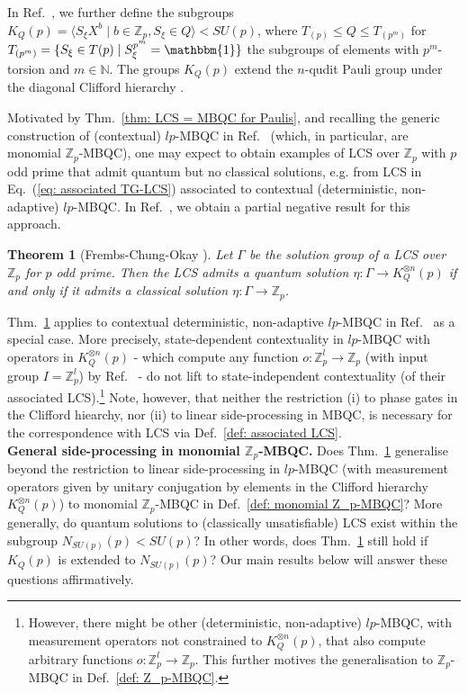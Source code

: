 \documentclass[aps,pra,letterpaper,onrcolumn,nofootinbib,notitlepage,longbibliography]{revtex4-1}
\newtheorem{theorem}{Theorem}
\newcommand{\one}{\mathbbm{1}}
\newcommand{\ra}{\ensuremath{\rightarrow}}
\newcommand{\zz}{\mathbb Z}
\newcommand{\N}{\mathbb N}
\newcommand{\suchthat}{\;\ifnum\currentgrouptype=16 \middle\fi|\;}
\begin{document}
In Ref.~\cite{FrembsChungOkay2022}, we further define the subgroups $K_Q(p)=\langle S_\xi X^b \mid b \in \zz_p, S_\xi\in Q \rangle<SU(p)$, where $T_{(p)}\leq Q\leq T_{(p^m)}$ for $T_{(p^m)}=\{S_\xi\in T(p)\suchthat S_\xi^{p^m}=\one\}$ the subgroups of elements with $p^m$-torsion and $m\in\N$. The groups $K_Q(p)$ extend the $n$-qudit Pauli group under the diagonal Clifford hierarchy \cite{CuiGottesmanKrishna2017,deSilva2021,FrembsChungOkay2022}.

Motivated by Thm.~\ref{thm: LCS = MBQC for Paulis}, and recalling the generic construction of (contextual) $lp$-MBQC in Ref.~\cite{FrembsRobertsCampbellBartlett2022} (which, in particular, are monomial $\zz_p$-MBQC), one may expect to obtain examples of LCS over $\zz_p$ with $p$ odd prime that admit quantum but no classical solutions, e.g. from LCS in Eq.~(\ref{eq: associated TG-LCS}) associated to contextual (deterministic, non-adaptive) $lp$-MBQC. In Ref.~\cite{FrembsChungOkay2022}, we obtain a partial negative result for this approach.

\begin{theorem}[Frembs-Chung-Okay \cite{FrembsChungOkay2022}]\label{thm: FCO}
    Let $\Gamma$ be the solution group of a LCS over $\zz_p$ for $p$ odd prime. Then the LCS admits a quantum solution $\eta: \Gamma \ra K^{\otimes n}_Q(p)$ if and only if it admits a classical solution $\eta:\Gamma\ra\zz_p$.
\end{theorem}

Thm.~\ref{thm: FCO} applies to contextual deterministic, non-adaptive $lp$-MBQC in Ref.~\cite{FrembsRobertsCampbellBartlett2022} as a special case. More precisely, state-dependent contextuality in $lp$-MBQC with operators in $K^{\otimes n}_Q(p)$ - which compute any function $o: \zz^l_p\ra\zz_p$ (with input group $I=\zz^l_p$) by Ref.~\cite{FrembsRobertsCampbellBartlett2022} - do not lift to state-independent contextuality (of their associated LCS).\footnote{However, there might be other (deterministic, non-adaptive) $lp$-MBQC, with measurement operators not constrained to $K^{\otimes n}_Q(p)$, that also compute arbitrary functions $o: \zz^l_p\ra\zz_p$. This further motives the generalisation to $\zz_p$-MBQC in Def.~\ref{def: Z_p-MBQC}.} Note, however, that neither the restriction (i) to phase gates in the Clifford hiearchy, nor (ii) to linear side-processing in MBQC, is necessary for the correspondence with LCS via Def.~\ref{def: associated LCS}.\\


\textbf{General side-processing in monomial $\zz_p$-MBQC.} Does Thm.~\ref{thm: FCO} generalise beyond the restriction to linear side-processing in $lp$-MBQC (with measurement operators given by unitary conjugation by elements in the Clifford hierarchy $K^{\otimes n}_Q(p)$) to monomial $\zz_p$-MBQC in Def.~\ref{def: monomial Z_p-MBQC}? More generally, do quantum solutions to (classically unsatisfiable) LCS exist within the subgroup $N_{SU(p)}(p)<SU(p)$? In other words, does Thm.~\ref{thm: FCO} still hold if $K_Q(p)$ is extended to $N_{SU(p)}(p)$? Our main results below will answer these questions affirmatively.
\end{document}
